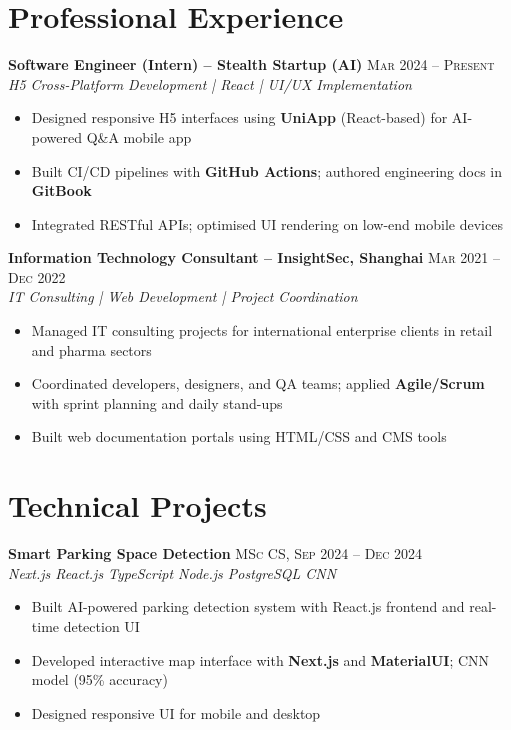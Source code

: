 \documentclass{simpleresume}
\begin{document}
\section{Professional Experience}
\noindent\textbf{Software Engineer (Intern) -- Stealth Startup (AI)}
  \hfill{\sffamily\scshape\small\color{muted}Mar 2024 -- Present}\\
  {\itshape\color{secondary}H5 Cross-Platform Development | React | UI/UX Implementation}
\vspace{-0.35mm}
\begin{itemize}
  \item Designed responsive H5 interfaces using \textbf{UniApp} (React-based) for AI-powered Q\&A mobile app
  \item Built CI/CD pipelines with \textbf{GitHub Actions}; authored engineering docs in \textbf{GitBook}
  \item Integrated RESTful APIs; optimised UI rendering on low-end mobile devices
\end{itemize}

\vspace{0.04cm}
\noindent\textbf{Information Technology Consultant -- InsightSec, Shanghai}
  \hfill{\sffamily\scshape\small\color{muted}Mar 2021 -- Dec 2022}\\
  {\itshape\color{secondary}IT Consulting | Web Development | Project Coordination}
\vspace{-0.35mm}
\begin{itemize}
  \item Managed IT consulting projects for international enterprise clients in retail and pharma sectors
  \item Coordinated developers, designers, and QA teams; applied \textbf{Agile/Scrum} with sprint planning and daily stand-ups
  \item Built web documentation portals using HTML/CSS and CMS tools
\end{itemize}

\section{Technical Projects}
\noindent\textbf{Smart Parking Space Detection} \hfill{\sffamily\scshape\small\color{muted}MSc CS, Sep 2024 -- Dec 2024}\\
{\itshape\color{accent}\footnotesize Next.js \quad\textbullet\quad React.js \quad\textbullet\quad TypeScript \quad\textbullet\quad Node.js \quad\textbullet\quad PostgreSQL \quad\textbullet\quad CNN}
\vspace{-0.35mm}
\begin{itemize}
  \item Built AI-powered parking detection system with React.js frontend and real-time detection UI
  \item Developed interactive map interface with \textbf{Next.js} and \textbf{MaterialUI}; CNN model (95\% accuracy)
  \item Designed responsive UI for mobile and desktop
\end{itemize}
\end{document}
